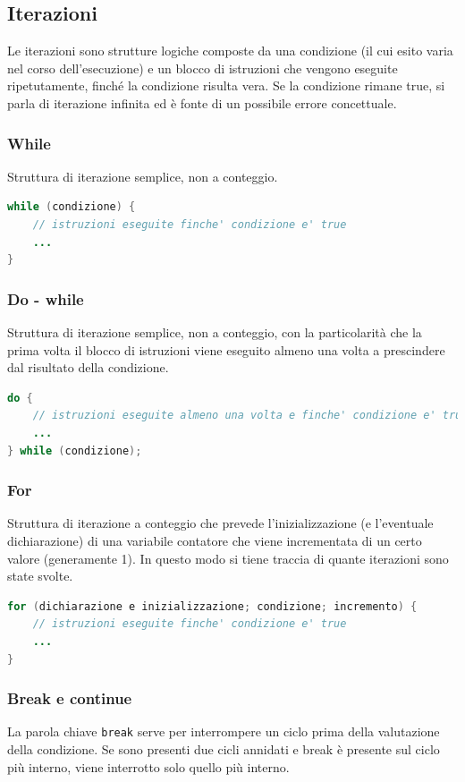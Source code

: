 \documentclass[a4paper]{article}
\begin{document}
\subsection{Iterazioni}
Le iterazioni sono strutture logiche composte da una condizione (il cui esito varia nel corso dell'esecuzione) e un blocco di
istruzioni che vengono eseguite ripetutamente, finché la condizione risulta vera. Se la condizione rimane true, si parla di
iterazione infinita ed è fonte di un possibile errore concettuale.

\subsubsection*{While}
Struttura di iterazione semplice, non a conteggio.
\begin{lstlisting}[language=Java]
while (condizione) {
	// istruzioni eseguite finche' condizione e' true
	...
}
\end{lstlisting}

\subsubsection*{Do - while}
Struttura di iterazione semplice, non a conteggio, con la particolarità che la prima volta il blocco di istruzioni viene eseguito
almeno una volta a prescindere dal risultato della condizione.
\begin{lstlisting}[language=Java]
do {
	// istruzioni eseguite almeno una volta e finche' condizione e' true
	...
} while (condizione);
\end{lstlisting}

\subsubsection*{For}
Struttura di iterazione a conteggio che prevede l'inizializzazione (e l'eventuale dichiarazione) di una variabile contatore che
viene incrementata di un certo valore (generamente 1). In questo modo si tiene traccia di quante iterazioni sono state svolte.
\begin{lstlisting}[language=Java]
for (dichiarazione e inizializzazione; condizione; incremento) {
	// istruzioni eseguite finche' condizione e' true
	...
}
\end{lstlisting}

\subsubsection*{Break e continue}
La parola chiave \verb|break| serve per interrompere un ciclo prima della valutazione della condizione. Se sono presenti due cicli annidati
e break è presente sul ciclo più interno, viene interrotto solo quello più interno.
\end{document}
